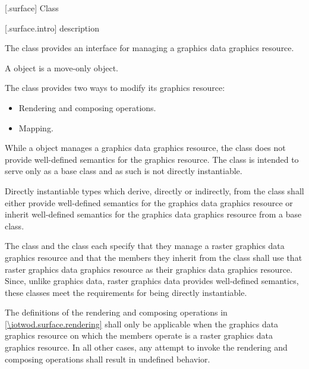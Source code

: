  [\iotwod.surface] {Class }

 [\iotwod.surface.intro] { description}

\pnum
{}%
The  class provides an interface for managing a graphics
data graphics resource.

\pnum
A  object is a move-only object.

\pnum
The  class provides two ways to modify its graphics resource:
\begin{itemize}
	\item Rendering and composing operations.
	\item Mapping.
\end{itemize}

\pnum
\begin{note}
While a  object manages a graphics data graphics resource, the  class does not provide well-defined semantics for the graphics resource. The  class is intended to serve only as a base class and as such is not directly instantiable.
\end{note}

\pnum
Directly instantiable types which derive, directly or indirectly, from the  class shall either provide well-defined semantics for the graphics data graphics resource or inherit well-defined semantics for the graphics data graphics resource from a base class.

\pnum
\begin{example}
The  class and the  class each specify that they manage a raster graphics data graphics resource and that the members they inherit from the  class shall use that raster graphics data graphics resource as their graphics data graphics resource. Since, unlike graphics data, raster graphics data provides well-defined semantics, these classes meet the requirements for being directly instantiable.
\end{example}

\pnum
The definitions of the rendering and composing operations in \ref{\iotwod.surface.rendering} shall only be applicable when the graphics data graphics resource on which the  members operate is a raster graphics data graphics resource. In all other cases, any attempt to invoke the rendering and composing operations shall result in undefined behavior.

